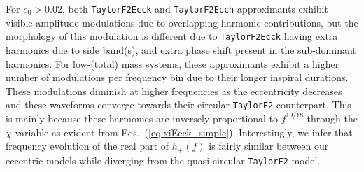 \documentclass[aps,prd,twocolumn,superscriptaddress,groupedaddress,nofootinbib,showpacs,eqsecnum,useAms]{revtex4-2}
\begin{document}
For $e_0 > 0.02$, both \texttt{TaylorF2Ecck} and \texttt{TaylorF2Ecch} approximants exhibit visible amplitude modulations due to overlapping harmonic contributions, but the morphology of this modulation is different due to \texttt{TaylorF2Ecck} having extra harmonics due to side band(s), and extra phase shift present in the sub-dominant harmonics.
For low-(total) mass systems, these approximants exhibit a higher number of modulations per frequency bin
due to their longer inspiral durations.
These modulations diminish at higher frequencies as the eccentricity decreases and these waveforms converge towards their circular \texttt{TaylorF2} 
counterpart.
This is mainly because these harmonics are inversely proportional to $f^{19/18}$ through the $\chi$ variable as evident from Eqs.~(\ref{eq:xiEcck_simple}).
Interestingly, we infer that frequency evolution of 
the real part of $\tilde{h}_+(f)$ is fairly similar between our eccentric models
while diverging from the quasi-circular \texttt{TaylorF2} model.

\end{document}
